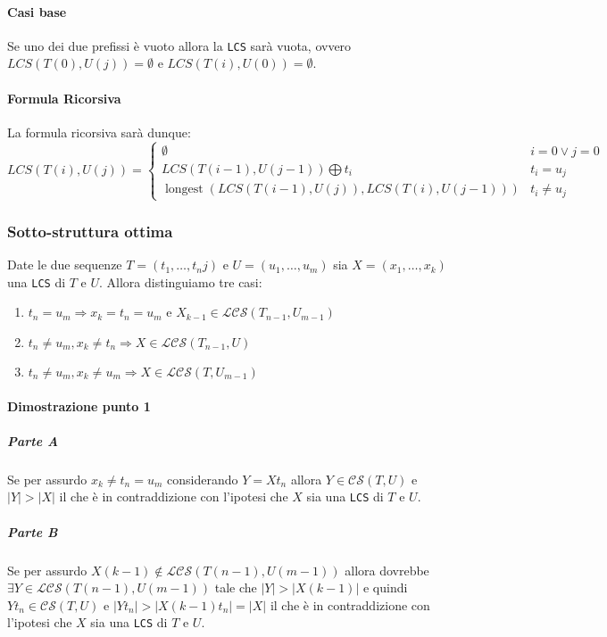             \paragraph{Casi base}
                Se uno dei due prefissi è vuoto allora la \texttt{LCS} sarà vuota, ovvero $LCS(T(0),U(j))=\emptyset$ e $LCS(T(i),U(0))=\emptyset$.
            \paragraph{Formula Ricorsiva}
                La formula ricorsiva sarà dunque:
                $$
                    LCS(T(i),U(j))=\begin{cases}
                        \emptyset & i=0\lor j=0 \\
                        LCS(T(i-1),U(j-1)) \bigoplus t_i & t_i=u_j \\
                        \operatorname{longest}(LCS(T(i-1),U(j)), LCS(T(i),U(j-1))) & t_i\neq u_j
                    \end{cases}
                $$
        \subsubsection{Sotto-struttura ottima}
            \begin{theorem}
                Date le due sequenze $T=(t_1,\dots,t_nj)$ e $U=(u_1,\dots,u_m)$ sia $X=(x_1,\dots,x_k)$ una \texttt{LCS} di $T$ e $U$. Allora distinguiamo tre casi:
                \begin{enumerate}
                    \item $t_n=u_m \Rightarrow x_k=t_n=u_m$ e $X_{k-1}\in \mathcal{LCS} (T_{n-1},U_{m-1})$
                    \item $t_n\neq u_m, x_k\neq t_n \Rightarrow X\in \mathcal{LCS}(T_{n-1},U)$
                    \item $t_n\neq u_m, x_k\neq u_m \Rightarrow X\in \mathcal{LCS}(T,U_{m-1})$
                \end{enumerate}
            \end{theorem}
            \paragraph{Dimostrazione punto 1}
                \subparagraph{Parte A}
                Se per assurdo $x_k\neq t_n = u_m$ considerando $Y=Xt_n$ allora $Y\in \mathcal{CS}(T,U)$ e $|Y|>|X|$ il che è in contraddizione con l'ipotesi che $X$ sia una \texttt{LCS} di $T$ e $U$.
                \subparagraph{Parte B} 
                Se per assurdo $X(k-1)\not\in \mathcal{LCS}(T(n-1),U(m-1))$ allora dovrebbe $\exists Y\in\mathcal{LCS}(T(n-1),U(m-1))$ tale che $|Y|>|X(k-1)|$ e quindi $Yt_n\in\mathcal{CS}(T,U)$ e $|Yt_n|>|X(k-1)t_n|=|X|$ il che è in contraddizione con l'ipotesi che $X$ sia una \texttt{LCS} di $T$ e $U$.

